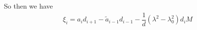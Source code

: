 \documentclass[12pt]{article}
\begin{document}
So then we have
\begin{align*}
\xi_i = a_i d_{i+1}
- \tilde{a}_{i-1} d_{i-1}
- \dfrac{1}{d} (\lambda^2 - \lambda_0^2) d_i M
\end{align*}







\end{document}
